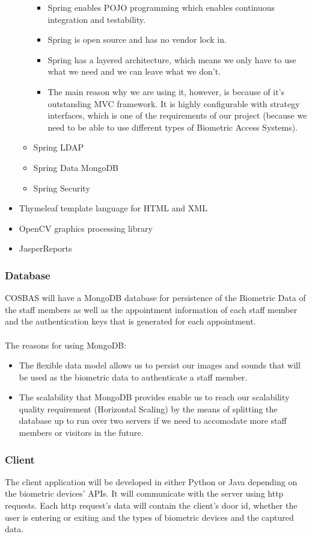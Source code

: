 \begin{itemize}
\begin{itemize}
\begin{itemize}
					\item Spring enables POJO programming which enables continuous integration and testability.
					\item Spring is open source and has no vendor lock in.
					\item Spring has a layered architecture, which means we only have to use what we need and we can leave what we don't.
					\item The main reason why we are using it, however, is because of it's outstanding MVC framework. It is highly configurable with strategy interfaces, which is one of the requirements of our project (because we need to be able to use different types of Biometric Access Systems).
				\end{itemize}
			\item Spring LDAP
			\item Spring Data MongoDB
			\item Spring Security
		\end{itemize}
	\item Thymeleaf template language for HTML and XML
	\item OpenCV graphics processing library
	\item JasperReports
\end{itemize}

\subsubsection{Database}
COSBAS will have a MongoDB database for persistence of the Biometric Data of the staff members as well as the appointment information of each staff member and the authentication keys that is generated for each appointment. \\
\\
The reasons for using MongoDB:
	\begin{itemize}
		\item The flexible data model allows us to persist our images and sounds that will be used as the biometric data to authenticate a staff member.
		\item The scalability that MongoDB provides enable us to reach our scalability quality requirement (Horizontal Scaling) by the means of splitting the database up to run over two servers if we need to accomodate more staff members or visitors in the future.
	\end{itemize}

\subsubsection{Client}
The client application will be developed in either Python or Java depending on the biometric devices' APIs. It will communicate with the server using http requests. Each http request's data will contain the client's door id, whether the user is entering or exiting and the types of biometric devices and the captured data. 

